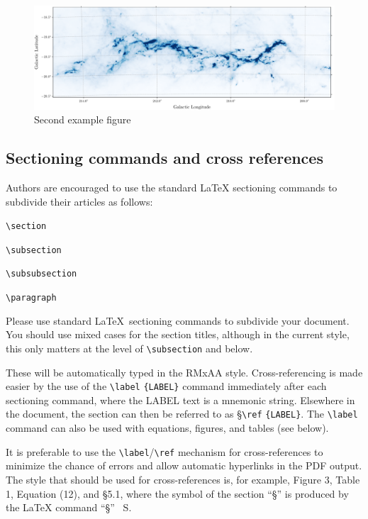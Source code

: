 \documentclass[9pt,article,twoside]{rmaa-rho-class/rmaa-rho}
\newcommand{\CS}[1]{\texttt{\textbackslash #1}}
\begin{document}
    \begin{figure}[t]
        \centering                
        \includegraphics[width=\textwidth]{figures/OrionAvMap.pdf}
        \caption{Second example figure}
        \label{fig:figure2}
    \end{figure}

\subsection{Sectioning commands and cross references}

    Authors are encouraged to use the standard \LaTeX{} sectioning commands to subdivide their articles as follows:

    \bigskip
    \CS{section}
    
    \CS{subsection}
    
    \CS{subsubsection}
    
    \CS{paragraph}
    \bigskip

    Please use standard \LaTeX\ sectioning commands to subdivide your document. You should use mixed cases for the section titles, although in the current style, this only matters at the level of \CS{subsection} and below.

    These will be automatically typed in the RMxAA style. Cross-referencing is made easier by the use of the \CS{label} \verb+{LABEL}+ command immediately after each sectioning command, where the LABEL text is a mnemonic string. Elsewhere in the document, the section can then be referred to as \S \CS{ref} \verb+{LABEL}+. The \CS{label} command can also be used with equations, figures, and tables (see below). 

    It is preferable to use the \CS{label}/\CS{ref} mechanism for cross-references to minimize the chance of errors and allow automatic hyperlinks in the PDF output. The style that should be used for cross-references is, for example, Figure 3, Table 1, Equation (12), and \S 5.1, where the symbol of the section “§” is produced by the \LaTeX{} command “\S” \ S.
\end{document}
